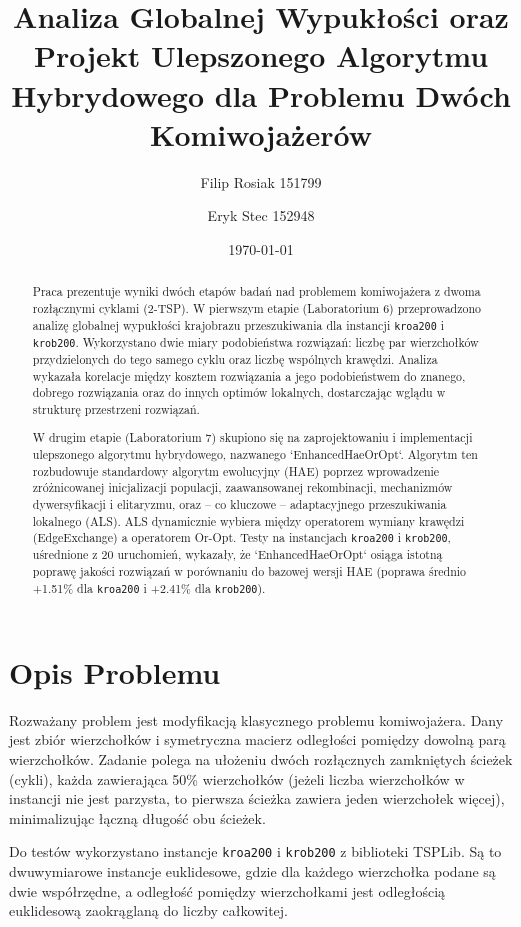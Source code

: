 \documentclass[12pt,a4paper]{article}
\title{Analiza Globalnej Wypukłości oraz Projekt Ulepszonego Algorytmu Hybrydowego dla Problemu Dwóch Komiwojażerów}
\author{Filip Rosiak 151799  \and Eryk Stec 152948}
\date{\today}
\begin{document}
\maketitle

\begin{abstract}
Praca prezentuje wyniki dwóch etapów badań nad problemem komiwojażera z dwoma rozłącznymi cyklami (2-TSP). W pierwszym etapie (Laboratorium 6) przeprowadzono analizę globalnej wypukłości krajobrazu przeszukiwania dla instancji \texttt{kroa200} i \texttt{krob200}. Wykorzystano dwie miary podobieństwa rozwiązań: liczbę par wierzchołków przydzielonych do tego samego cyklu oraz liczbę wspólnych krawędzi. Analiza wykazała korelacje między kosztem rozwiązania a jego podobieństwem do znanego, dobrego rozwiązania oraz do innych optimów lokalnych, dostarczając wglądu w strukturę przestrzeni rozwiązań.

W drugim etapie (Laboratorium 7) skupiono się na zaprojektowaniu i implementacji ulepszonego algorytmu hybrydowego, nazwanego `EnhancedHaeOrOpt`. Algorytm ten rozbudowuje standardowy algorytm ewolucyjny (HAE) poprzez wprowadzenie zróżnicowanej inicjalizacji populacji, zaawansowanej rekombinacji, mechanizmów dywersyfikacji i elitaryzmu, oraz – co kluczowe – adaptacyjnego przeszukiwania lokalnego (ALS). ALS dynamicznie wybiera między operatorem wymiany krawędzi (EdgeExchange) a operatorem Or-Opt. Testy na instancjach \texttt{kroa200} i \texttt{krob200}, uśrednione z 20 uruchomień, wykazały, że `EnhancedHaeOrOpt` osiąga istotną poprawę jakości rozwiązań w porównaniu do bazowej wersji HAE (poprawa średnio +1.51\% dla \texttt{kroa200} i +2.41\% dla \texttt{krob200}).
\end{abstract}

\section{Opis Problemu}
Rozważany problem jest modyfikacją klasycznego problemu komiwojażera. Dany jest zbiór wierzchołków i symetryczna macierz odległości pomiędzy dowolną parą wierzchołków. Zadanie polega na ułożeniu dwóch rozłącznych zamkniętych ścieżek (cykli), każda zawierająca 50\% wierzchołków (jeżeli liczba wierzchołków w instancji nie jest parzysta, to pierwsza ścieżka zawiera jeden wierzchołek więcej), minimalizując łączną długość obu ścieżek.

Do testów wykorzystano instancje \texttt{kroa200} i \texttt{krob200} z biblioteki TSPLib. Są to dwuwymiarowe instancje euklidesowe, gdzie dla każdego wierzchołka podane są dwie współrzędne, a odległość pomiędzy wierzchołkami jest odległością euklidesową zaokrąglaną do liczby całkowitej.
\end{document}
